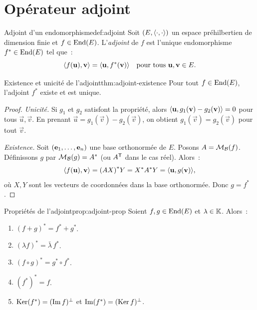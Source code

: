 \section{Opérateur adjoint}\label{sec:adjoint}

\begin{definition}{Adjoint d'un endomorphisme}{def:adjoint}
  Soit $(E,\langle\cdot,\cdot\rangle)$ un espace préhilbertien de dimension
  finie et $f\in\operatorname{End}(E)$. L'\emph{adjoint} de $f$ est l'unique
  endomorphisme $f^*\in\operatorname{End}(E)$ tel que~:
  \[
    \langle f(\mathbf{u}),\mathbf{v}\rangle=\langle\mathbf{u},f^*(\mathbf{v})\rangle
    \quad\text{pour tous }\mathbf{u},\mathbf{v}\in E.
  \]
\end{definition}

\begin{theorem}{Existence et unicité de l'adjoint}{thm:adjoint-existence}
  Pour tout $f\in\operatorname{End}(E)$, l'adjoint $f^*$ existe et est unique.
\end{theorem}

\begin{proof}
  \emph{Unicité.} Si $g_1$ et $g_2$ satisfont la propriété, alors
  $\langle\mathbf{u},g_1(\mathbf{v})-g_2(\mathbf{v})\rangle=0$ pour tous
  $\vec{u},\vec{v}$. En prenant $\vec{u}=g_1(\vec{v})-g_2(\vec{v})$,
  on obtient $g_1(\vec{v})=g_2(\vec{v})$ pour tout $\vec{v}$.

  \emph{Existence.} Soit $(\mathbf{e}_{1},\ldots,\mathbf{e}_{n})$ une base
  orthonormée de $E$. Posons $A=\mathcal{M}_{\mathcal{B}}(f)$. Définissons $g$ par
  $\mathcal{M}_{\mathcal{B}}(g)={A}^{*}$ (ou ${A}^{\mathsf{T}}$ dans le cas réel). Alors~:
  \[
    \langle f(\mathbf{u}),\mathbf{v}\rangle={(AX)}^{*}Y={X}^{*}{A}^{*}Y
    =\langle\mathbf{u},g(\mathbf{v})\rangle,
  \]
  où $X,Y$ sont les vecteurs de coordonnées dans la base orthonormée.
  Donc $g=f^*$.
\end{proof}

\begin{proposition}{Propriétés de l'adjoint}{prop:adjoint-prop}
  Soient $f,g\in\operatorname{End}(E)$ et $\lambda\in{\mathbb{K}}$. Alors~:
  \begin{enumerate}[label=(\roman*)]
    \item $(f+g)^*=f^*+g^*$.
    \item $(\lambda f)^*=\bar{\lambda}\,f^*$.
    \item $(f\circ g)^*=g^*\circ f^*$.
    \item $(f^*)^*=f$.
    \item $\operatorname{Ker}(f^*)=(\operatorname{Im} f)^\perp$ et $\operatorname{Im}(f^*)=(\operatorname{Ker} f)^\perp$.
  \end{enumerate}
\end{proposition}

